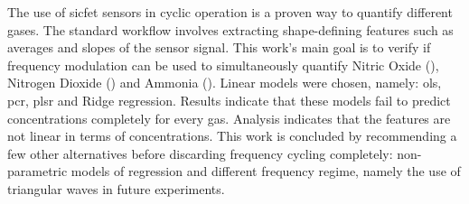 The use of \acrfull{sicfet} sensors  in cyclic operation is a proven way to quantify different gases. The standard workflow involves extracting shape-defining features such as averages and slopes of the sensor signal. This work's main goal is to verify if frequency modulation can be used to simultaneously quantify Nitric Oxide (), Nitrogen Dioxide () and Ammonia (). Linear models were chosen, namely: \acrfull{ols}, \acrfull{pcr}, \acrfull{plsr} and Ridge regression. Results indicate that these models fail to predict concentrations completely for every gas. Analysis indicates that the features are not linear in terms of concentrations. This work is concluded by recommending a few other alternatives before discarding frequency cycling completely: non-parametric models of regression and different frequency regime, namely the use of triangular waves in future experiments.